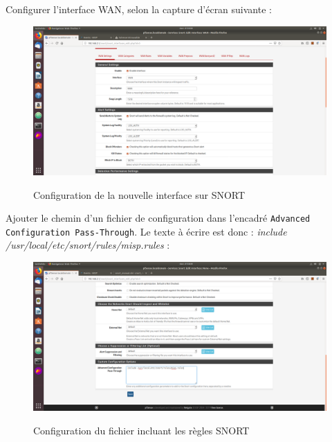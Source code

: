 Configurer l'interface WAN, selon la capture d'écran suivante :
\begin{figure}[h!]
    \begin{center}
        \includegraphics[scale=0.33]{MISP_Screenshots/Snort/9.png}
        \label{MISP_Screenshots/Snort/9}
        \caption{Configuration de la nouvelle interface sur SNORT}
    \end{center}
\end{figure}
\FloatBarrier

\pagebreak

Ajouter le chemin d'un fichier de configuration dans l'encadré \texttt{Advanced Configuration Pass-Through}. Le texte à écrire est donc : \textit{include /usr/local/etc/snort/rules/misp.rules} :
\begin{figure}[h!]
    \begin{center}
        \includegraphics[scale=0.31]{MISP_Screenshots/Snort/10.png}
        \label{MISP_Screenshots/Snort/10}
        \caption{Configuration du fichier incluant les règles SNORT}
    \end{center}
\end{figure}
\FloatBarrier 

